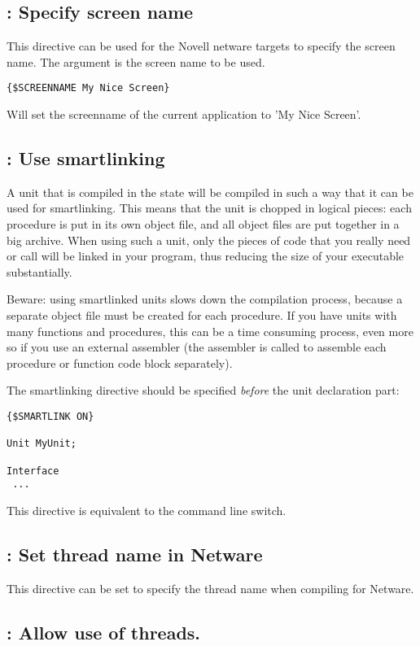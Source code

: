 \subsection{ : Specify screen name}
This directive can be used for the Novell netware targets to specify the screen name. 
The argument is the screen name to be used.
\begin{verbatim}
{$SCREENNAME My Nice Screen}
\end{verbatim}
Will set the screenname of the current application to 'My Nice Screen'.

\subsection{ : Use smartlinking}

A unit that is compiled in the  state will be
compiled in such a way that it can be used for smartlinking. This means that
the unit is chopped in logical pieces: each procedure is put in its own
object file, and all object files are put together in a big archive. When
using such a unit, only the pieces of code that you really need or call
will be linked in your program, thus reducing the size of your executable
substantially.

Beware: using smartlinked units slows down the compilation process, because
a separate object file must be created for each procedure. If you have units
with many functions and procedures, this can be a time consuming process,
even more so if you use an external assembler (the assembler is called to
assemble each procedure or function code block separately).

The smartlinking directive should be specified {\em before} the unit
declaration part:
\begin{verbatim}
{$SMARTLINK ON}

Unit MyUnit;

Interface
 ...
\end{verbatim}

This directive is equivalent to the  command line switch.

\subsection{ : Set thread name in Netware}
This directive can be set to specify the thread name when compiling for
Netware. 

\subsection{ : Allow use of threads.}

